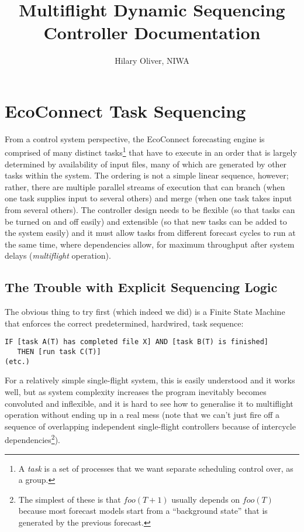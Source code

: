\documentclass[12pt]{article}
\title{Multiflight Dynamic Sequencing Controller Documentation}
\author{Hilary Oliver, NIWA}
\begin{document}
\maketitle

\section{EcoConnect Task Sequencing} 

From a control system perspective, the EcoConnect forecasting engine is
comprised of many distinct tasks\footnote{A {\em task} is a set of
processes that we want separate scheduling control over, as a group.}
that have to execute in an order that is largely determined by
availability of input files, many of which are generated by other tasks
within the system.  The ordering is not a simple linear sequence,
however; rather, there are multiple parallel streams of execution that
can branch (when one task supplies input to several others) and merge
(when one task takes input from several others). The controller design
needs to be flexible (so that tasks can be turned on and off easily) and
extensible (so that new tasks can be added to the system easily) and it
must allow tasks from different forecast cycles to run at the same time,
where dependencies allow, for maximum throughput after system delays
({\em multiflight} operation). 


\subsection{The Trouble with Explicit Sequencing Logic}

The obvious thing to try first (which indeed we did) is a Finite State
Machine that enforces the correct predetermined, hardwired, task
sequence: 

\begin{verbatim}
IF [task A(T) has completed file X] AND [task B(T) is finished]
   THEN [run task C(T)] 
(etc.)
\end{verbatim} 

For a relatively simple single-flight system, this is easily understood
and it works well, but as system complexity increases the program
inevitably becomes convoluted and inflexible, and it is hard to see how
to generalise it to multiflight operation without ending up in a real
mess (note that we can't just fire off a sequence of overlapping
independent single-flight controllers because of intercycle
dependencies\footnote{The simplest of these is that $foo(T+1)$ usually
depends on $foo(T)$ because most forecast models start from a
``background state'' that is generated by the previous forecast.}). 
\end{document}
